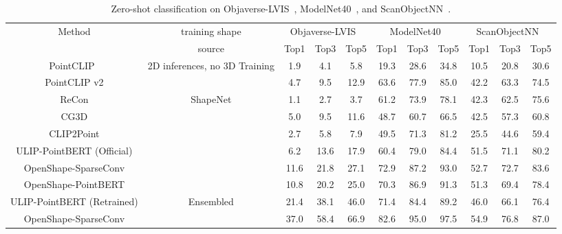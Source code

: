 \begin{table}[t]
\scriptsize
  \setlength{\tabcolsep}{5pt}
  \centering
  \caption{Zero-shot classification on Objaverse-LVIS~\cite{objaverse}, ModelNet40~\cite{wu20153d}, and ScanObjectNN~\cite{udandaraounderstanding}.}
  \vspace{-1em}
    \begin{tabular}{c|c|ccc|ccc|ccc}
    \toprule
    \multirow{2}[4]{*}{Method} & training shape  & \multicolumn{3}{c|}{Objaverse-LVIS~\cite{objaverse}} & \multicolumn{3}{c|}{ModelNet40~\cite{wu20153d}} & \multicolumn{3}{c}{ScanObjectNN~\cite{uy2019revisiting}} \\
\cmidrule{3-11}          & source & Top1  & Top3  & Top5  & Top1  & Top3  & Top5  & Top1  & Top3  & Top5 \\
    \midrule
    PointCLIP~\cite{zhang2022pointclip} & \multirow{2}[1]{1.5cm}{2D inferences, no 3D Training} & 1.9   & 4.1      & 5.8   & 19.3  & 28.6      & 34.8  & 10.5  & 20.8      & 30.6 \\
    PointCLIP v2 \cite{zhu2022pointclipv2} &       & 4.7   & 9.5      & 12.9  & 63.6  & 77.9      & 85.0  & 42.2  & 63.3      & 74.5 \\
    \midrule
    ReCon \cite{qi2023contrast} & \multirow{6}[2]{*}{ShapeNet} & 1.1      & 2.7      & 3.7      & 61.2  & 73.9      & 78.1      & 42.3      & 62.5      & 75.6 \\
    CG3D \cite{hegde2023clip} &       & 5.0      & 9.5       & 11.6      & 48.7  & 60.7      & 66.5      & 42.5    & 57.3      & 60.8  \\
    CLIP2Point \cite{huang2022clip2point} &       & 2.7       & 5.8      & 7.9      & 49.5  & 71.3      & 81.2      & 25.5      & 44.6      & 59.4 \\
     ULIP-PointBERT (Official) \cite{xue2022ulip} &       & 6.2   & 13.6      & 17.9  & 60.4  & 79.0      & 84.4    & 51.5  & 71.1      & 80.2 \\
    OpenShape-SparseConv & & 11.6 & 21.8 & 27.1 & 72.9 & 87.2 & 93.0 & 52.7 & 72.7 & 83.6\\ 
     OpenShape-PointBERT & & 10.8 & 20.2 & 25.0 & 70.3 & 86.9 & 91.3 & 51.3 & 69.4 & 78.4 \\
    \midrule
    ULIP-PointBERT (Retrained) & \multirow{2}[1]{*}{Ensembled}  & 21.4  & 38.1      & 46.0      & 71.4  & 84.4      & 89.2      & 46.0     & 66.1      & 76.4 \\
    OpenShape-SparseConv  & \multirow{2}[1]{*}{(no LVIS)} & 37.0  &   58.4    & 66.9  & 82.6  &   95.0    & 97.5  &    54.9   &  76.8     &  87.0 \\

\end{tabular}
\end{table}
